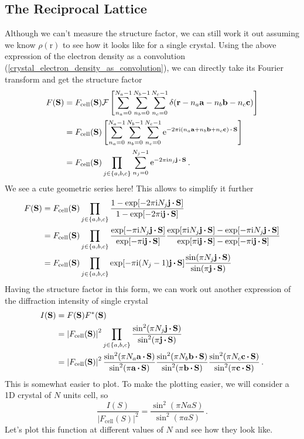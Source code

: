 \documentclass{article}
\theoremstyle{plain}\theoremheaderfont{\normalfont\itshape}\theorembodyfont{\rmfamily}\theoremseparator{.}\newtheorem*{rem}{Remark}\newtheorem*{ex}{Example}\newtheorem*{proof}{Proof}\newtheorem*{altp}{Alternative proof}
\theoremstyle{plain}\theoremheaderfont{\normalfont\bfseries}\theorembodyfont{\rmfamily}\theoremseparator{.}\newtheorem{thm}{Theorem}[section]\newtheorem{lem}[thm]{Lemma}\newtheorem{prop}[thm]{Proposition}\newtheorem*{cor}{Corollary}\newtheorem{defn}[thm]{Definition}\newtheorem{clm}[thm]{Claim}\newtheorem{clminproof}{Claim}\newtheorem*{law}{Law}\newtheorem{pos}[thm]{Postulate}
\theoremstyle{break}\theoremheaderfont{\normalfont\itshape}\theorembodyfont{\rmfamily}\theoremseparator{.\medskip}\newtheorem*{proofskip}{Proof}\newtheorem*{exs}{Examples}\newtheorem*{rems}{Remarks}
\theoremstyle{break}\theoremheaderfont{\normalfont\bfseries}\theorembodyfont{\rmfamily}\theoremseparator{.\medskip}\newtheorem{lemskip}[thm]{Lemma}\newtheorem{defnskip}[thm]{Definition}\newtheorem{propskip}[thm]{Proposition}\newtheorem{thmskip}[thm]{Theorem}
\numberwithin{equation}{section}
\newcommand{\ii}{\mathrm{i}}
\newcommand{\ee}{\mathrm{e}}
\newcommand{\vb}[1]{\bm{\mathrm{#1}}}
\newcommand{\vdot}{\,\bm{\mathrm{\cdot}}\,}
\newcommand{\abs}[1]{\left| #1 \right|}
\begin{document}
    \subsection{The Reciprocal Lattice}
    Although we can't measure the structure factor, we can still work it out assuming we know \(\rho(\vb{r})\) to see how it looks like for a single crystal. Using the above expression of the electron density as a convolution (\ref{crystal_electron_density_as_convolution}), we can directly take its Fourier transform and get the structure factor
    \begin{align}
        F(\vb{S})&=F_{\text{cell}}(\vb{S})\mathcal{F}\left[\sum_{n_a=0}^{N_a-1}\sum_{n_b=0}^{N_b-1}\sum_{n_c=0}^{N_c-1}\delta(\vb{r}-n_a\vb{a}-n_b\vb{b}-n_c\vb{c})\right]\notag \\
        &=F_{\text{cell}}(\vb{S})\left[\sum_{n_a=0}^{N_a-1}\sum_{n_b=0}^{N_b-1}\sum_{n_c=0}^{N_c-1}\ee^{-2\pi \ii(n_a\vb{a}+n_b\vb{b}+n_c\vb{c})\vdot\vb{S}}\right]\notag \\
        &=F_{\text{cell}}(\vb{S})\prod_{j\in\{a,b,c\}}\sum_{n_j=0}^{N_j-1}\ee^{-2\pi \ii n_j\vb{j}\vdot\vb{S}}\,.
    \end{align}
    We see a cute geometric series here! This allows to simplify it further
    \begin{align}
        F(\vb{S})&=F_{\text{cell}}(\vb{S})\prod_{j\in\{a,b,c\}}\frac{1-\exp[-2\pi \ii N_j\vb{j}\vdot\vb{S}]}{1-\exp[-2\pi \ii\vb{j}\vdot\vb{S}]}\notag \\
        &=F_{\text{cell}}(\vb{S})\prod_{j\in\{a,b,c\}}\frac{\exp[-\pi \ii N_j\vb{j}\vdot\vb{S}]}{\exp[-\pi \ii\vb{j}\vdot\vb{S}]}\frac{\exp[\pi \ii N_j\vb{j}\vdot\vb{S}]-\exp[-\pi \ii N_j\vb{j}\vdot\vb{S}]}{\exp[\pi \ii\vb{j}\vdot\vb{S}]-\exp[-\pi \ii\vb{j}\vdot\vb{S}]}\notag \\
        &=F_{\text{cell}}(\vb{S})\prod_{j\in\{a,b,c\}}\exp[-\pi \ii (N_j-1)\vb{j}\vdot\vb{S}]\frac{\sin(\pi N_j\vb{j}\vdot\vb{S})}{\sin(\pi\vb{j}\vdot\vb{S})}
    \end{align}
    Having the structure factor in this form, we can work out another expression of the diffraction intensity of single crystal
    \begin{align}
        I(\vb{S})&=F(\vb{S})F^*(\vb{S})\notag\\
        &=\abs{F_{\text{cell}}(\vb{S})}^2\prod_{j\in\{a,b,c\}}\frac{\sin^2(\pi N_j\vb{j}\vdot\vb{S})}{\sin^2(\pi\vb{j}\vdot\vb{S})}\notag\\
        &=\abs{F_{\text{cell}}(\vb{S})}^2\frac{\sin^2(\pi N_a\vb{a}\vdot\vb{S})}{\sin^2(\pi\vb{a}\vdot\vb{S})}\frac{\sin^2(\pi N_b\vb{b}\vdot\vb{S})}{\sin^2(\pi\vb{b}\vdot\vb{S})}\frac{\sin^2(\pi N_c\vb{c}\vdot\vb{S})}{\sin^2(\pi\vb{c}\vdot\vb{S})}\,.
    \end{align}
    This is somewhat easier to plot. To make the plotting easier, we will consider a 1D crystal of \(N\) units cell, so
    \begin{equation}
        \frac{I(S)}{\abs{F_{\text{cell}}(S)}^2}=\frac{\sin^2(\pi NaS)}{\sin^2(\pi aS)}\,.
    \end{equation}
    Let's plot this function at different values of \(N\) and see how they look like.
\end{document}
